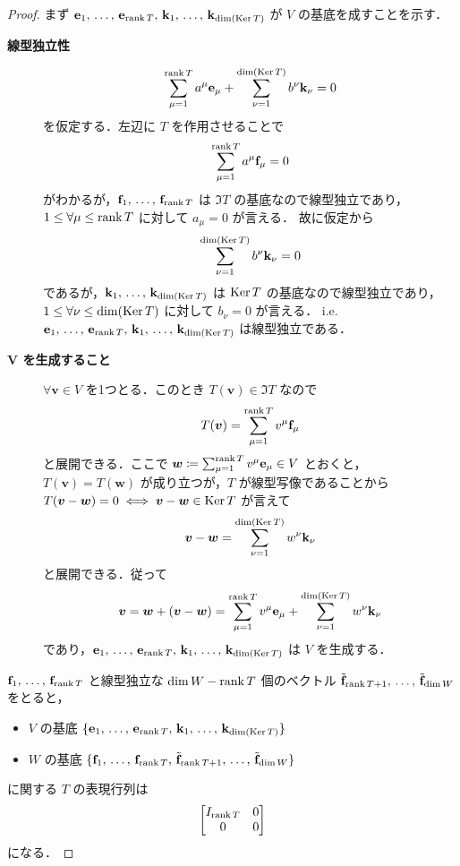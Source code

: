 \documentclass[rep_main]{subfiles}
\begin{document}
\begin{proof}
	まず $\vb{e}_1,\, \dots ,\, \vb{e}_{\rank T},\, \vb{k}_1,\, \dots,\, \vb{k}_{\dim (\operatorname{Ker} T)}$ が $V$ の基底を成すことを示す．
	\begin{description}
		\item[\textbf{線型独立性}] 
		\begin{align}
			\sum_{\mu = 1}^{\rank T} a^\mu \vb{e}_\mu + \sum_{\nu = 1}^{\dim (\operatorname{Ker} T)} b^\nu \vb{k}_\nu = 0
		\end{align}
		を仮定する．左辺に $T$ を作用させることで
		\begin{align}
			\sum_{\mu = 1}^{\rank T} a^\mu \vb{f}_\mu = 0
		\end{align}
		がわかるが，$\vb{f}_1,\, \dots,\, \vb{f}_{\rank T}$ は $\Im T$ の基底なので線型独立であり，$1 \le \forall \mu \le \rank T$ に対して $a_\mu = 0$ が言える．
		故に仮定から
		\begin{align}
			\sum_{\nu = 1}^{\dim (\operatorname{Ker} T)} b^\nu \vb{k}_\nu = 0
		\end{align}
		であるが，$\vb{k}_1,\, \dots,\, \vb{k}_{\dim (\operatorname{Ker} T)}$ は $\operatorname{Ker} T$ の基底なので線型独立であり，$1 \le \forall \nu \le \dim (\operatorname{Ker} T)$ に対して $b_\nu = 0$ が言える．
		i.e. $\vb{e}_1,\, \dots ,\, \vb{e}_{\rank T},\, \vb{k}_1,\, \dots,\, \vb{k}_{\dim (\operatorname{Ker} T)}$ は線型独立である．
		\item[\textbf{$\bm{V}$ を生成すること}] 
		$\forall \bm{v} \in V$ を1つとる．このとき $T(\bm{v}) \in \Im T$ なので
		\begin{align}
			T(\bm{v}) = \sum_{\mu = 1}^{\rank T} v^\mu \vb{f}_\mu
		\end{align}
		と展開できる．ここで
		$\bm{w} \coloneqq \sum_{\mu=1}^{\rank T} v^\mu \vb{e}_\mu \in V$ 
		とおくと，$T(\bm{v}) = T(\bm{w})$ が成り立つが，$T$ が線型写像であることから $T(\bm{v} - \bm{w}) = 0 \iff \bm{v} - \bm{w} \in \operatorname{Ker} T$ が言えて
		\begin{align}
			\bm{v} - \bm{w} = \sum_{\nu = 1}^{\dim (\operatorname{Ker} T)} w^\nu \vb{k}_\nu
		\end{align}
		と展開できる．従って
		\begin{align}
			\bm{v} = \bm{w} + (\bm{v} - \bm{w})
			= \sum_{\mu=1}^{\rank T} v^\mu \vb{e}_\mu + \sum_{\nu = 1}^{\dim (\operatorname{Ker} T)} w^\nu \vb{k}_\nu
		\end{align}
		であり，$\vb{e}_1,\, \dots ,\, \vb{e}_{\rank T},\, \vb{k}_1,\, \dots,\, \vb{k}_{\dim (\operatorname{Ker} T)}$ は $V$ を生成する．
	\end{description}
	$\vb{f}_1,\, \dots,\, \vb{f}_{\rank T}$ と線型独立な $\dim W - \rank T$ 個のベクトル $\tilde{\vb{f}}_{\rank T + 1},\, \dots,\, \tilde{\vb{f}}_{\dim W}$ をとると，
	\begin{itemize}
		\item $V$ の基底 $\{\vb{e}_1,\, \dots ,\, \vb{e}_{\rank T},\, \vb{k}_1,\, \dots,\, \vb{k}_{\dim (\operatorname{Ker} T)}\}$ 
		\item $W$ の基底 $\{\vb{f}_1,\, \dots,\, \vb{f}_{\rank T},\, \tilde{\vb{f}}_{\rank T + 1},\, \dots,\, \tilde{\vb{f}}_{\dim W}\}$
	\end{itemize}
	に関する $T$ の表現行列は
	\begin{align}
		\mqty[I_{\rank T} & 0 \\ 0 & 0]
	\end{align}
	になる．
\end{proof}
\end{document}
